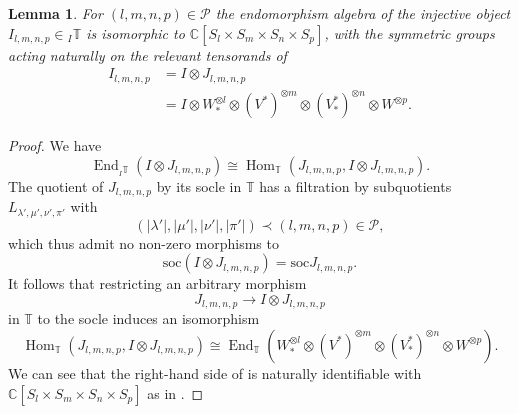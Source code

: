 \documentclass[11pt]{article}
\theoremstyle{plain}
\newtheorem{lemma}{Lemma}[section]
\theoremstyle{nonumberplain}
\theoremstyle{plain}
\numberwithin{equation}{section}
\theoremstyle{nonumberplain}
\newtheorem{proof}{Proof}
\newcommand\bC{{\mathbb C}}
\newcommand\bT{{\mathbb T}}
\newcommand\cP{{\mathcal P}}
\newcommand\1{{\bf 1}}
\DeclareMathOperator{\End}{\mathrm{End}}
\DeclareMathOperator{\Hom}{\mathrm{Hom}}
\begin{document}
\begin{lemma}\label{le:deg0}
  For $(l,m,n,p)\in \cP$ the endomorphism algebra of the injective object $I_{l,m,n,p}\in {}_I\bT$ is isomorphic to $\bC[S_l\times S_m\times S_n\times S_p]$, with the symmetric groups acting naturally on the relevant tensorands of
  \begin{align*}
    I_{l,m,n,p} &= I\otimes J_{l,m,n,p}\\
                &=I\otimes W_*^{\otimes l}\otimes (V^*)^{\otimes m}\otimes (V_*^*)^{\otimes n} \otimes W^{\otimes p}.
  \end{align*}
\end{lemma}
\begin{proof}
  We have
  \begin{equation*}
    \End_{{}_I\bT}(I\otimes J_{l,m,n,p})\cong \Hom_{\bT}(J_{l,m,n,p},I\otimes J_{l,m,n,p}). 
  \end{equation*}
  The quotient of $J_{l,m,n,p}$ by its socle in $\bT$ has a filtration by subquotients $L_{\lambda',\mu',\nu',\pi'}$ with
  \begin{equation*}
    (|\lambda'|,|\mu'|,|\nu'|,|\pi'|) \prec (l,m,n,p)\in \cP,
  \end{equation*}
  which thus admit no non-zero morphisms to
  \begin{equation*}
    \mathrm{soc}(I\otimes J_{l,m,n,p} )= \mathrm{soc}J_{l,m,n,p}. 
  \end{equation*}
  It follows that restricting an arbitrary morphism 
  \begin{equation*}
    J_{l,m,n,p}\to I\otimes J_{l,m,n,p}
  \end{equation*}
  in $\bT$ to the socle induces an isomorphism
  \begin{equation}\label{eq:homend}
    \Hom_{\bT}(J_{l,m,n,p},I\otimes J_{l,m,n,p})
    \cong
    \End_{\bT}\left(W_*^{\otimes l}\otimes (V^*)^{\otimes m}\otimes (V_*^*)^{\otimes n} \otimes W^{\otimes p}\right). 
  \end{equation}
  We can see that the right-hand side of  is naturally identifiable with $\bC[S_l\times S_m\times S_n\times S_p]$ as in .
\end{proof}
\end{document}
